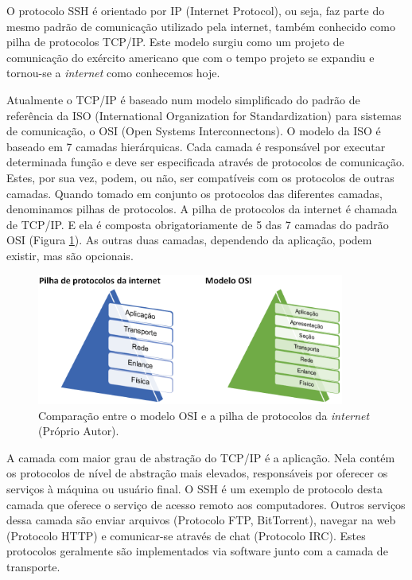 O protocolo SSH é orientado por IP (Internet Protocol), ou seja, faz parte do mesmo padrão de comunicação utilizado pela internet, também conhecido como pilha de protocolos TCP/IP. Este modelo surgiu como um projeto de comunicação do exército americano que com o tempo projeto se expandiu e tornou-se a \emph{internet} como conhecemos hoje. 

Atualmente o TCP/IP é baseado num modelo simplificado do padrão de referência da ISO (International Organization for Standardization) para sistemas de comunicação, o OSI (Open Systems Interconnectons). O modelo da ISO é baseado em 7 camadas hierárquicas. Cada camada é responsável por executar determinada função e deve ser especificada através de protocolos de comunicação. Estes, por sua vez, podem, ou não, ser compatíveis com os protocolos de outras camadas. Quando tomado em conjunto os protocolos das diferentes camadas, denominamos pilhas de protocolos. A pilha de protocolos da internet é chamada de TCP/IP. E ela é composta obrigatoriamente de 5 das 7 camadas do padrão OSI (Figura \ref{figura:osi_hierarquia}). As outras duas camadas, dependendo da aplicação, podem existir, mas são opcionais.

\begin{figure}[h]
	\centering
	\includegraphics[width=0.9\textwidth]{figuras/osi_hierarquia.png}
	\caption{Comparação entre o modelo OSI e a pilha de protocolos da \emph{internet} (Próprio Autor).}
	\label{figura:osi_hierarquia}
\end{figure}

A camada com maior grau de abstração do TCP/IP é a aplicação. Nela contém os protocolos de nível de abstração mais elevados, responsáveis por oferecer os serviços à máquina ou usuário final. O SSH é um exemplo de protocolo desta camada que oferece o serviço de acesso remoto aos computadores. Outros serviços dessa camada são enviar arquivos (Protocolo FTP, BitTorrent), navegar na web (Protocolo HTTP) e comunicar-se através de chat (Protocolo IRC). Estes protocolos geralmente são implementados via software junto com a camada de transporte.

